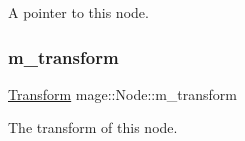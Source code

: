A pointer to this node. \hypertarget{classmage_1_1_node_a0f4dd0c46d9713fd64b0e562862afac6}{}\label{classmage_1_1_node_a0f4dd0c46d9713fd64b0e562862afac6} 
\subsubsection{\texorpdfstring{m\+\_\+transform}{m\_transform}}
{\footnotesize\ttfamily \hyperlink{classmage_1_1_transform}{Transform} mage\+::\+Node\+::m\+\_\+transform\hspace{0.3cm}{\ttfamily [private]}}

The transform of this node. 